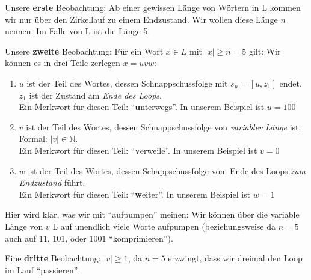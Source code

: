 Unsere \textbf{erste} Beobachtung:
Ab einer gewissen Länge von Wörtern in L kommen wir nur über den Zirkellauf zu einem
Endzustand.
Wir wollen diese Länge $n$ nennen. Im Falle von L ist die Länge 5.

Unsere \textbf{zweite} Beobachtung:
Für ein Wort $x \in L$ mit $|x| \geq n = 5$ gilt:
Wir können es in drei Teile zerlegen
$x = uvw$:
\begin{enumerate}
    \item $u$ ist der Teil des Wortes,
        dessen Schnappschussfolge mit $s_u = [u,z_1]$ endet.
        $z_1$ ist der Zustand am \emph{Ende des Loops}.\\
        Ein Merkwort für diesen Teil: ``\textbf{u}nterwegs''.
        In unserem Beispiel ist $u = 100$
    \item $v$ ist der Teil des Wortes,
        dessen Schnappschussfolge von \emph{variabler Länge} ist.
        Formal: $|v| \in \mathbb{N}$.\\
        Ein Merkwort für diesen Teil: ``\textbf{v}erweile''.
        In unserem Beispiel ist $v = 0$
    \item $w$ ist der Teil des Wortes,
        dessen Schappschussfolge vom Ende des Loops \emph{zum Endzustand} führt.\\
        Ein Merkwort für diesen Teil: ``\textbf{w}eiter''.
        In unserem Beispiel ist $w = 1$
\end{enumerate}
Hier wird klar, was wir mit ``aufpumpen'' meinen:
Wir können über die variable Länge von $v$ L auf unendlich viele Worte aufpumpen
(beziehungsweise da $n = 5$ auch auf $11$, $101$, oder $1001$ ``komprimieren'').

Eine \textbf{dritte} Beobachtung:
$|v| \geq 1$, da $n = 5$ erzwingt,
dass wir dreimal den Loop im Lauf ``passieren''.

